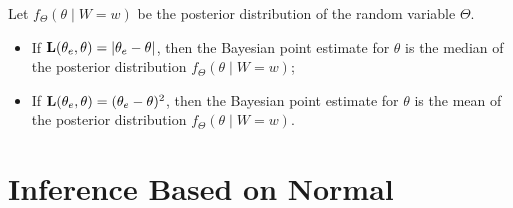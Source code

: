 \begin{thm}{}
	Let $f_\Theta(\theta\mid W=w)$ be the posterior distribution of the random variable $\Theta$.
	\begin{itemize}
		\item If $\vb{L}(\theta_e,\theta)=\abs{\theta_e-\theta}$, then the Bayesian point estimate for $\theta$ is the median of the posterior distribution $f_\Theta(\theta\mid W=w)$;
		\item If $\vb{L}(\theta_e,\theta)=(\theta_e-\theta)^2$, then the Bayesian point estimate for $\theta$ is the mean of the posterior distribution $f_\Theta(\theta\mid W=w)$.
	\end{itemize}	
\end{thm}

\newpage
\section{Inference Based on Normal}
